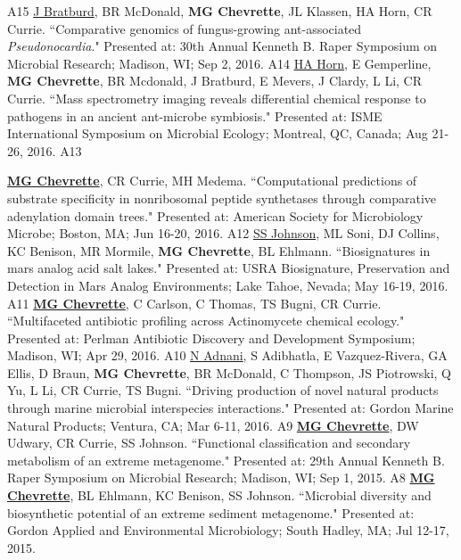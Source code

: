 \begin{cvpubs}
    {A15} %
  \cvpub
    {\underline{J Bratburd}, BR McDonald, \textbf{MG Chevrette}, JL Klassen, HA Horn, CR Currie. ``Comparative genomics of fungus-growing ant-associated \textit{Pseudonocardia}." Presented at: 30th Annual Kenneth B. Raper Symposium on Microbial Research; Madison, WI; Sep 2, 2016.} %
    {A14} %
  \cvpub
    {\underline{HA Horn}, E Gemperline, \textbf{MG Chevrette}, BR Mcdonald, J Bratburd, E Mevers, J Clardy, L Li, CR Currie. ``Mass spectrometry imaging reveals differential chemical response to pathogens in an ancient ant-microbe symbiosis." Presented at: ISME International Symposium on Microbial Ecology; Montreal, QC, Canada; Aug 21-26, 2016.} %
    {A13} %
\end{cvpubs}
\begin{cvpubs}
  \cvpub
    {\textbf{\underline{MG Chevrette}}, CR Currie, MH Medema.  ``Computational predictions of substrate specificity in nonribosomal peptide synthetases through comparative adenylation domain trees." Presented at: American Society for Microbiology Microbe; Boston, MA; Jun 16-20, 2016.} %
    {A12} %
  \cvpub
    {\underline{SS Johnson}, ML Soni, DJ Collins, KC Benison, MR Mormile, \textbf{MG Chevrette}, BL Ehlmann. ``Biosignatures in mars analog acid salt lakes." Presented at: USRA Biosignature, Preservation and Detection in Mars Analog Environments; Lake Tahoe, Nevada; May 16-19, 2016.} %
    {A11} %
  \cvpub
    {\textbf{\underline{MG Chevrette}}, C Carlson, C Thomas, TS Bugni, CR Currie. ``Multifaceted antibiotic profiling across Actinomycete chemical ecology." Presented at: Perlman Antibiotic Discovery and Development Symposium; Madison, WI; Apr 29, 2016.} %
    {A10} %
  \cvpub
    {\underline{N Adnani}, S Adibhatla, E Vazquez-Rivera, GA Ellis, D Braun, \textbf{MG Chevrette}, BR McDonald, C Thompson, JS Piotrowski, Q Yu, L Li, CR Currie, TS Bugni. ``Driving production of novel natural products through marine microbial interspecies interactions." Presented at: Gordon Marine Natural Products; Ventura, CA; Mar 6-11, 2016.} %
    {A9} %
  \cvpub
    {\textbf{\underline{MG Chevrette}}, DW Udwary, CR Currie, SS Johnson. ``Functional classification and secondary metabolism of an extreme metagenome." Presented at: 29th Annual Kenneth B. Raper Symposium on Microbial Research; Madison, WI; Sep 1, 2015.} %
    {A8} %
  \cvpub
    {\textbf{\underline{MG Chevrette}}, BL Ehlmann, KC Benison, SS Johnson. ``Microbial diversity and biosynthetic potential of an extreme sediment metagenome." Presented at: Gordon Applied and Environmental Microbiology; South Hadley, MA; Jul 12-17, 2015.} %

\end{cvpubs}
